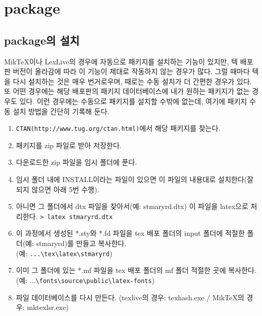 









	\chapter{package}


	\clearpage
	\section{package의 설치}

		MikTeX이나 LexLive의 경우에 자동으로 패키지를 설치하는 기능이 있지만, 텍 배포판 버전이 올라감에 따라 	이 기능이 제대로 작동하지 않는 경우가 많다.
		그럴 때마다 텍을 다시 설치하는 것은 매우 번거로우며, 때로는 수동 설치가 더 간편한 경우가 있다. 
		또 어떤 경우에는 해당 배포판의 패키지 데이터베이스에 내가 원하는 패키지가 없는 경우도 있다. 
		이런 경우에는 수동으로 패키지를 설치할 수밖에 없는데, 여기에 패키지 수동 설치 방법을 간단히 기록해 둔다.

			\begin{enumerate}
			\item 	\verb|CTAN(http://www.tug.org/ctan.html)|에서 해당 패키지를 찾는다.
			\item  	패키지를 zip 파일로 받아 저장한다.
			\item  	다운로드한 zip 파일을 임시 폴더에 푼다.
			\item 	임시 폴더 내에 INSTALL이라는 파일이 있으면 이 파일의 내용대로 설치한다(잘 되지 않으면 아래 5번 수행).
			\item 	아니면 그 폴더에서 dtx 파일을 찾아서(예: stmaryrd.dtx) 이 파일을 latex으로 처리한다.
					\verb|> latex stmaryrd.dtx|
			\item 	이 과정에서 생성된 *.sty와 *.fd 파일을 tex 배포 폴더의 input 폴더에 적절한 폴더(예: stmaryrd)를 만들고 복사한다.\\
					(예: \verb|...\tex\latex\stmaryrd|)
			\item 	이미 그 폴더에 있는 *.mf 파일을 tex 배포 폴더의 mf 폴더 적절한 곳에 복사한다. \\
					(예: ...\verb|\fonts\source\public\latex-fonts|)
			\item 	파일 데이터베이스를 다시 만든다.
					(texlive의 경우: texhash.exe / MikTeX의 경우: mktexlsr.exe)
			\end{enumerate}
			
